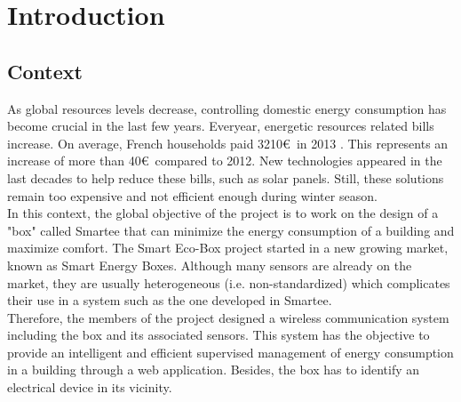 %
%
\section{Introduction}

\subsection{Context}

As global resources levels decrease, controlling domestic energy consumption has become crucial in the last few years. Everyear, energetic resources related bills increase. On average, French households paid 3210\euro\ in 2013 \cite{context}. This represents an increase of more than 40\euro\ compared to 2012. New technologies appeared in the last decades to help reduce these bills, such as solar panels. Still, these solutions remain too expensive and not efficient enough during winter season.\\


In this context, the global objective of the project is to work on the design of a "box" called Smartee that can minimize the energy consumption of a building and maximize comfort. The Smart Eco-Box project started in a new growing market, known as Smart Energy Boxes. Although many sensors are already on the market, they are usually heterogeneous (i.e. non-standardized) which complicates their use in a system such as the one developed in Smartee.\\

Therefore, the members of the project designed a wireless communication system including the box and its associated sensors. This system has the objective to provide an intelligent and efficient supervised management of energy consumption in a building through a web application. Besides, the box has to identify an electrical device in its vicinity.\\

